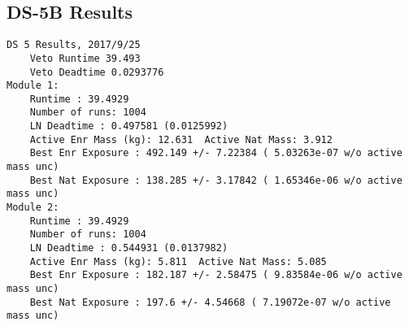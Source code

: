 \documentclass[notitlepage,rmp,aps,10pt]{revtex4-1}
\begin{document}
\subsection{DS-5B Results}
\begin{verbatim}
DS 5 Results, 2017/9/25
	Veto Runtime 39.493
	Veto Deadtime 0.0293776
Module 1:
	Runtime : 39.4929
	Number of runs: 1004
	LN Deadtime : 0.497581 (0.0125992)
	Active Enr Mass (kg): 12.631  Active Nat Mass: 3.912
	Best Enr Exposure : 492.149 +/- 7.22384 ( 5.03263e-07 w/o active mass unc)
	Best Nat Exposure : 138.285 +/- 3.17842 ( 1.65346e-06 w/o active mass unc)
Module 2:
	Runtime : 39.4929
	Number of runs: 1004
	LN Deadtime : 0.544931 (0.0137982)
	Active Enr Mass (kg): 5.811  Active Nat Mass: 5.085
	Best Enr Exposure : 182.187 +/- 2.58475 ( 9.83584e-06 w/o active mass unc)
	Best Nat Exposure : 197.6 +/- 4.54668 ( 7.19072e-07 w/o active mass unc)


\end{verbatim}
\end{document}

